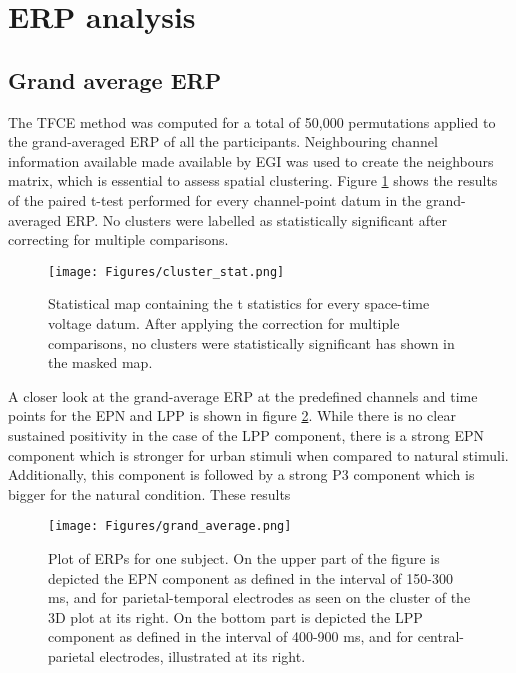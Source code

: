 \section{ERP analysis}
\label{section:baseline}

\subsection{Grand average ERP}

The TFCE method was computed for a total of 50,000 permutations applied to the grand-averaged ERP of all the participants. Neighbouring channel information available made available by EGI was used to create the neighbours matrix, which is essential to assess spatial clustering. Figure \ref{fig:cluster_analysis} shows the results of the paired t-test performed for every channel-point datum in the grand-averaged ERP. No clusters were labelled as statistically significant after correcting for multiple comparisons.

\begin{figure}[H]
	\centering
	\texttt{[image: Figures/cluster\_stat.png]}
	\caption{Statistical map containing the t statistics for every space-time voltage datum. After applying the correction for multiple comparisons, no clusters were statistically significant has shown in the masked map. \label{fig:cluster_analysis}}
\end{figure}

A closer look at the grand-average ERP at the predefined channels and time points for the EPN and LPP is shown in figure \ref{fig:grand_average}. While there is no clear sustained positivity in the case of the LPP component, there is a strong EPN component which is stronger for urban stimuli when compared to natural stimuli. Additionally, this component is followed by a strong P3 component which is bigger for the natural condition. These results

\begin{figure}[H]
	\centering
	\texttt{[image: Figures/grand\_average.png]}
	\caption{Plot of ERPs for one subject. On the upper part of the figure is depicted the EPN component as defined in the interval of 150-300 ms, and for parietal-temporal electrodes as seen on the cluster of the 3D plot at its right. On the bottom part is depicted the LPP component as defined in the interval of 400-900 ms, and for central-parietal electrodes, illustrated at its right. \label{fig:grand_average}}
\end{figure}


